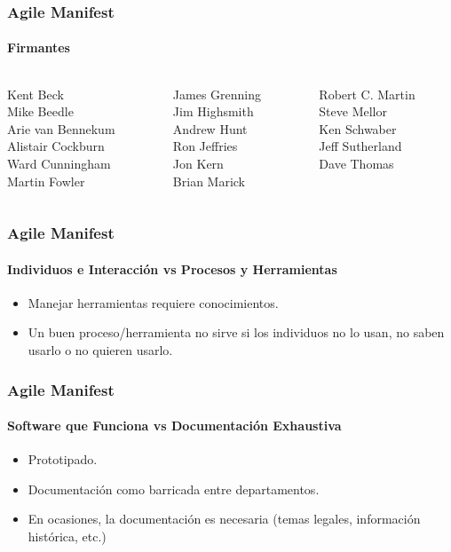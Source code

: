 \begin{frame}
  \frametitle{Agile Manifest}
  \framesubtitle{Firmantes}
    \begin{columns}
    \begin{column}{4cm}
      Kent Beck\\
      Mike Beedle\\
      Arie van Bennekum\\
      Alistair Cockburn\\
      Ward Cunningham\\
      Martin Fowler
    \end{column}
    \begin{column}{3cm}
      James Grenning\\
      Jim Highsmith\\
      Andrew Hunt\\
      Ron Jeffries\\
      Jon Kern\\
      Brian Marick
    \end{column}
    \begin{column}{3cm}
      Robert C. Martin\\
      Steve Mellor\\
      Ken Schwaber\\
      Jeff Sutherland\\
      Dave Thomas
    \end{column}
  \end{columns}
\end{frame}



\begin{frame}
  \frametitle{Agile Manifest}
  \framesubtitle{Individuos e Interacción vs Procesos y Herramientas}

  \begin{itemize}
  \item Manejar herramientas requiere conocimientos.
  \item Un buen proceso/herramienta no sirve si los individuos no lo usan, no saben usarlo o no quieren usarlo.
  \end{itemize}

\end{frame}


\begin{frame}
  \frametitle{Agile Manifest}
  \framesubtitle{Software que Funciona vs Documentación Exhaustiva}

  \begin{itemize}
  \item Prototipado.
  \item Documentación como barricada entre departamentos.
  \item En ocasiones, la documentación es necesaria (temas legales, información histórica, etc.)
  \end{itemize}

\end{frame}

